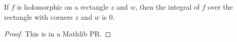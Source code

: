 \begin{theorem}
\label{HolomorphicOn.vanishesOnRectangle}
\leanok
If $f$ is holomorphic on a rectangle $z$ and $w$, then the
  integral of $f$ over the rectangle with corners $z$ and $w$
  is $0$.
\end{theorem}
\begin{proof}
\leanok
This is in a Mathlib PR.
\end{proof}
